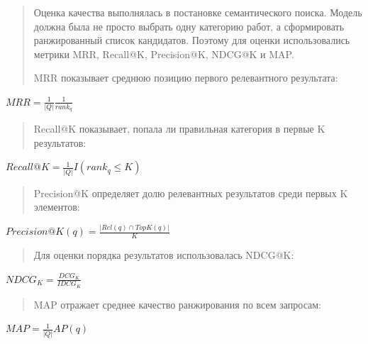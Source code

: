 \begin{quote}
Оценка качества выполнялась в постановке семантического поиска. Модель
должна была не просто выбрать одну категорию работ, а сформировать
ранжированный список кандидатов. Поэтому для оценки использовались
метрики MRR, Recall@K, Precision@K, NDCG@K и MAP.

MRR показывает среднюю позицию первого релевантного результата:
\end{quote}

\(MRR = \frac{1}{|Q|}\frac{1}{rank_{q}}\)

\begin{quote}
Recall@K показывает, попала ли правильная категория в первые K
результатов:
\end{quote}

\(Recall@K = \frac{1}{|Q|}I\left( rank_{q} \leq K \right)\)

\begin{quote}
Precision@K определяет долю релевантных результатов среди первых K
элементов:
\end{quote}

\(Precision@K(q) = \frac{\left| Rel(q) \cap TopK(q) \right|}{K}\)

\begin{quote}
Для оценки порядка результатов использовалась NDCG@K:
\end{quote}

\(NDCG_{K} = \frac{DCG_{K}}{IDCG_{K}}\)

\begin{quote}
MAP отражает среднее качество ранжирования по всем запросам:
\end{quote}

\(MAP = \frac{1}{|Q|}AP(q)\)

